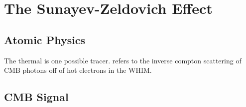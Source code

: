 \chapter{The Sunayev-Zeldovich Effect}
\section{Atomic Physics}
The thermal \sze is one possible tracer. \sze refers to the inverse compton scattering of CMB photons off of hot electrons in the WHIM. 
\section{CMB Signal}
